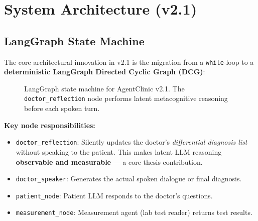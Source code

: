 \documentclass[12pt, a4paper]{article}
\begin{document}
\section{System Architecture (v2.1)}

\subsection{LangGraph State Machine}

The core architectural innovation in v2.1 is the migration from a \texttt{while}-loop to a \textbf{deterministic LangGraph Directed Cyclic Graph (DCG)}:

\begin{figure}[H]
\centering
{}
\caption{LangGraph state machine for AgentClinic v2.1. The \texttt{doctor\_reflection} node performs latent metacognitive reasoning before each spoken turn.}
\end{figure}

\noindent\textbf{Key node responsibilities:}
\begin{itemize}
    \item \texttt{doctor\_reflection}: Silently updates the doctor's \textit{differential diagnosis list} without speaking to the patient. This makes latent LLM reasoning \textbf{observable and measurable} — a core thesis contribution.
    \item \texttt{doctor\_speaker}: Generates the actual spoken dialogue or final diagnosis.
    \item \texttt{patient\_node}: Patient LLM responds to the doctor's questions.
    \item \texttt{measurement\_node}: Measurement agent (lab test reader) returns test results.
\end{itemize}
\end{document}
